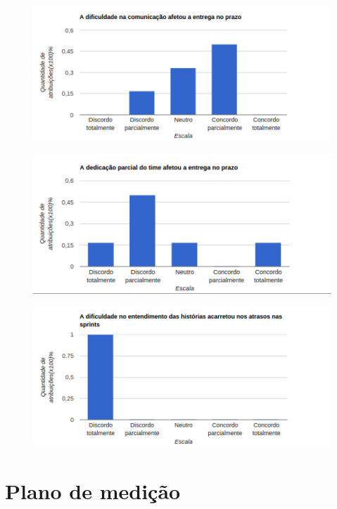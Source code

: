 \begin{apendicesenv}
 			\begin{figure}[!htb]
 			\center
 			\includegraphics[scale=0.9]{figuras/grafico_6.png}
 			\end{figure}

 			\begin{figure}[!htb]
 			\center
 			\includegraphics[scale=0.9]{figuras/grafico_7.png}
 			\end{figure}

 			\begin{figure}[!htb]
 			\center
 			\includegraphics[scale=0.9]{figuras/grafico_8.png}
 			\end{figure}

  \chapter{Plano de medição}


    

\end{apendicesenv}
